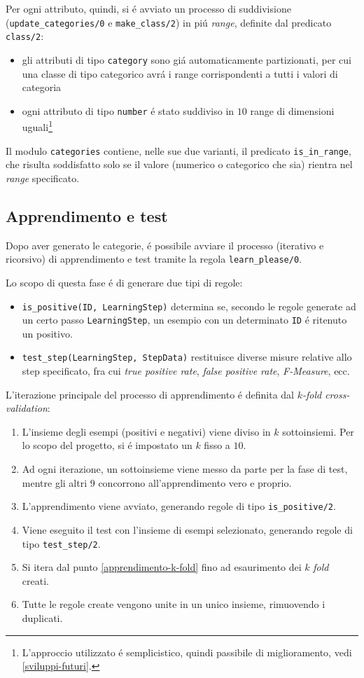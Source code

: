 \documentclass[preprint]{acm_proc_article-sp}
\begin{document}
Per ogni attributo, quindi, si \'e avviato un processo di suddivisione (\verb|update_categories/0| e \verb|make_class/2|) in pi\'u \textit{range}, definite dal predicato \verb|class/2|:
\begin{itemize}
\item gli attributi di tipo \verb|category| sono gi\'a automaticamente partizionati, per cui una classe di tipo categorico avr\'a i range corrispondenti a tutti i valori di categoria
\item ogni attributo di tipo \verb|number| \'e stato suddiviso in $10$ range di dimensioni uguali\footnote{L'approccio utilizzato \'e semplicistico, quindi passibile di miglioramento, vedi \ref{sviluppi-futuri}.}
\end{itemize}

Il modulo \verb|categories| contiene, nelle sue due varianti, il predicato \verb|is_in_range|, che risulta soddisfatto solo se il valore (numerico o categorico che sia) rientra nel \textit{range} specificato.

\subsection{Apprendimento e test}
\label{prolog-learner}
Dopo aver generato le categorie, \'e possibile avviare il processo (iterativo e ricorsivo) di apprendimento e test tramite la regola \verb|learn_please/0|.

Lo scopo di questa fase \'e di generare due tipi di regole:
\begin{itemize}
\item \verb|is_positive(ID, LearningStep)| determina se, secondo le regole generate ad un certo passo \verb|LearningStep|, un esempio con un determinato \verb|ID| \'e ritenuto un positivo.
\item \verb|test_step(LearningStep, StepData)| restituisce diverse misure relative allo step specificato, fra cui \textit{true positive rate}, \textit{false positive rate}, \textit{F-Measure}, ecc.
\end{itemize}

L'iterazione principale del processo di apprendimento \'e definita dal $k$\textit{-fold cross-validation}:
\begin{enumerate}
\item L'insieme degli esempi (positivi e negativi) viene diviso in $k$ sottoinsiemi. Per lo scopo del progetto, si \'e impostato un $k$ fisso a $10$.
\item\label{apprendimento-k-fold} Ad ogni iterazione, un sottoinsieme viene messo da parte per la fase di test, mentre gli altri $9$ concorrono all'apprendimento vero e proprio.
\item L'apprendimento viene avviato, generando regole di tipo \verb|is_positive/2|.
\item Viene eseguito il test con l'insieme di esempi selezionato, generando regole di tipo \verb|test_step/2|.
\item Si itera dal punto \ref{apprendimento-k-fold} fino ad esaurimento dei $k$ \textit{fold} creati.
\item Tutte le regole create vengono unite in un unico insieme, rimuovendo i duplicati.
\end{enumerate}
\end{document}

